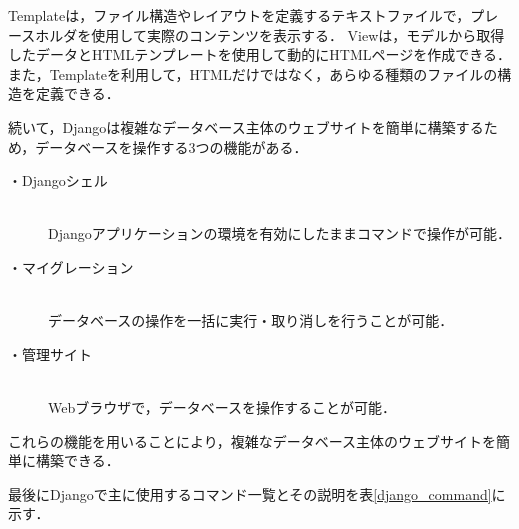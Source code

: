 Templateは，ファイル構造やレイアウトを定義するテキストファイルで，プレースホルダを使用して実際のコンテンツを表示する．
Viewは，モデルから取得したデータとHTMLテンプレートを使用して動的にHTMLページを作成できる．
また，Templateを利用して，HTMLだけではなく，あらゆる種類のファイルの構造を定義できる．

\newpage
続いて，Djangoは複雑なデータベース主体のウェブサイトを簡単に構築するため，データベースを操作する3つの機能がある．
\begin{description}
    \item[・Djangoシェル]\mbox{}\\
        Djangoアプリケーションの環境を有効にしたままコマンドで操作が可能．
    \item[・マイグレーション]\mbox{}\\
        データベースの操作を一括に実行・取り消しを行うことが可能．
    \item[・管理サイト]\mbox{}\\
        Webブラウザで，データベースを操作することが可能． 
\end{description}
これらの機能を用いることにより，複雑なデータベース主体のウェブサイトを簡単に構築できる．

最後にDjangoで主に使用するコマンド一覧とその説明を表\ref{django_command}に示す．

